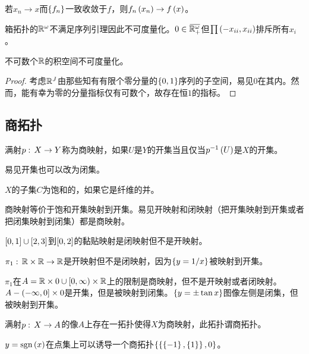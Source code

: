 \documentclass{ctexrep}
\begin{document}
  \begin{collary}
    若$x_n\rightarrow x$而$\left\{f_n\right\}$一致收敛于$f$，则$f_n\left(x_n\right)\rightarrow f\left(x\right)$。
  \end{collary}
  \begin{ex}
    箱拓扑的$\mathbb{R}^\omega$不满足序列引理因此不可度量化。$0\in\clo{\R_+^\omega}$但$\prod\left(-x_{ii},x_{ii}\right)$排斥所有$x_i$。
  \end{ex}
  \begin{ex}
    不可数个$\mathbb{R}$的积空间不可度量化。
  \end{ex}
  \begin{proof}
    考虑$\mathbb{R}^J$由那些知有有限个零分量的$\left\{0,1\right\}$序列的子空间，易见$0$在其内。然而，能有幸为零的分量指标仅有可数个，故存在恒$1$的指标。
  \end{proof}
  \subsection{商拓扑}
  \begin{definition}
    满射$p:\, X \rightarrow Y$称为商映射，如果$U$是$Y$的开集当且仅当$p^{-1}\left(U\right)$是$X$的开集。
  \end{definition}
  易见开集也可以改为闭集。
  \begin{definition}
    $X$的子集$C$为饱和的，如果它是纤维的并。
  \end{definition}
  商映射等价于饱和开集映射到开集。易见开映射和闭映射（把开集映射到开集或者把闭集映射到闭集）都是商映射。
  \begin{ex}
    $\left[0,1\right]\cup\left[2,3\right]$到$\left[0,2\right]$的黏贴映射是闭映射但不是开映射。
  \end{ex}
  \begin{ex}
    $\pi_1:\, \mathbb{R}\times\mathbb{R} \rightarrow \mathbb{R}$是开映射但不是闭映射，因为$\left\{y=1/x\right\}$被映射到开集。
  \end{ex}
  \begin{ex}
  \label{ex:qnotoc}
    $\pi_1$在$A=\mathbb{R}\times0 \cup \left[0,\infty\right) \times \mathbb{R}$上的限制是商映射，但不是开映射或者闭映射。$A-\left(-\infty,0\right]\times 0$是开集，但是被映射到闭集。$\left\{y=\pm\tan x\right\}$图像左侧是闭集，但被映射到开集。
  \end{ex}
  \begin{definition}
    满射$p:\, X \rightarrow A$的像$A$上存在一拓扑使得$X$为商映射，此拓扑谓商拓扑。
  \end{definition}
  \begin{ex}
    $y=\mathrm{sgn}\left(x\right)$在点集上可以诱导一个商拓扑$\left\{\left\{\left\{-1\right\},\left\{1\right\}\right\},0\right\}$。
  \end{ex}
\end{document}
